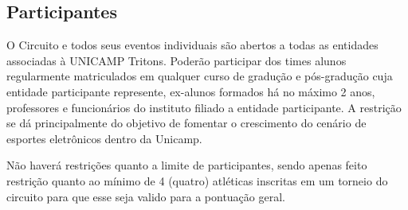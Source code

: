 \subsection{Participantes}

O Circuito e todos seus eventos individuais são abertos a todas as entidades associadas à UNICAMP Tritons. Poderão participar dos times alunos regularmente matriculados em qualquer curso de gradução e pós-gradução cuja entidade participante represente, ex-alunos formados há no máximo 2 anos, professores e funcionários do instituto filiado a entidade participante. A restrição se dá principalmente do objetivo de fomentar o crescimento do cenário de esportes eletrônicos dentro da Unicamp.

Não haverá restrições quanto a limite de participantes, sendo apenas feito restrição quanto ao mínimo de 4 (quatro) atléticas inscritas em um torneio do circuito para que esse seja valido para a pontuação geral.
